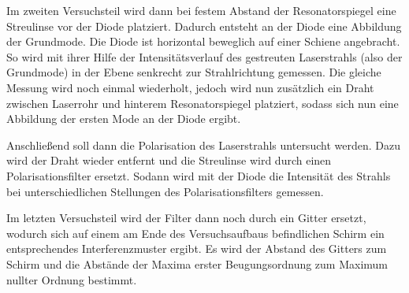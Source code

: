 Im zweiten Versuchsteil wird dann bei festem Abstand der Resonatorspiegel eine
Streulinse vor der Diode platziert. Dadurch entsteht an der Diode eine Abbildung
der Grundmode. Die Diode ist horizontal beweglich auf einer
Schiene angebracht. So wird mit ihrer Hilfe der Intensitätsverlauf des gestreuten
Laserstrahls (also der Grundmode) in der Ebene senkrecht zur Strahlrichtung gemessen.
Die gleiche Messung wird noch einmal wiederholt, jedoch wird nun zusätzlich ein
Draht zwischen Laserrohr und hinterem Resonatorspiegel platziert, sodass sich nun
eine Abbildung der ersten Mode an der Diode ergibt.

Anschließend soll dann die Polarisation des Laserstrahls untersucht werden. Dazu
wird der Draht wieder entfernt und die Streulinse wird durch einen Polarisationsfilter
ersetzt. Sodann wird mit der Diode die Intensität des Strahls bei unterschiedlichen
Stellungen des Polarisationsfilters gemessen.

Im letzten Versuchsteil wird der Filter dann noch durch ein Gitter ersetzt, wodurch
sich auf einem am Ende des Versuchsaufbaus befindlichen Schirm ein entsprechendes
Interferenzmuster ergibt. Es wird der Abstand des Gitters zum Schirm und die Abstände
der Maxima erster Beugungsordnung zum Maximum nullter Ordnung bestimmt.
